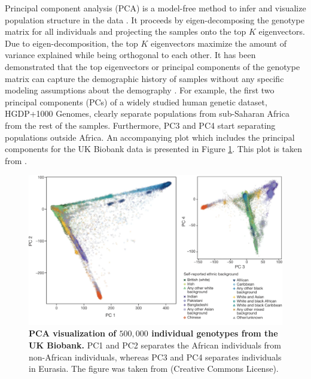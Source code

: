 Principal component analysis (PCA) is a model-free method to infer and visualize population structure in the data \cite{menozzi1978synthetic,Patterson2006, price2006principal}. It proceeds by eigen-decomposing the genotype matrix for all individuals and projecting the samples onto the top \(K\) eigenvectors. Due to eigen-decomposition, the top \(K\) eigenvectors maximize the amount of variance explained while being orthogonal to each other. It has been demonstrated that the top eigenvectors or principal components of the genotype matrix can capture the demographic history of samples without any specific modeling assumptions about the demography \cite{Patterson2006,novembre2008interpreting}. For example, the first two principal components (PCs) of a widely studied human genetic dataset, HGDP+1000 Genomes, clearly separate populations from sub-Saharan Africa from the rest of the samples. Furthermore, PC3 and PC4 start separating populations outside Africa. An accompanying plot which includes the principal components for the UK Biobank data is presented in Figure \ref{fig:pc_plot}. This plot is taken from \cite{bycroft2018uk}.

\begin{figure}[h!]
    \centering
    \includegraphics[width=\linewidth]{figures/thesis_pc_plot.pdf}
    \caption{\textbf{PCA visualization of $500,000$ individual genotypes from the UK Biobank.} PC1 and PC2 separates the African individuals from non-African individuals, whereas PC3 and PC4 separates individuals in Eurasia. The figure was taken from \cite{bycroft2018uk} (Creative Commons License).}
    \label{fig:pc_plot}
\end{figure}

